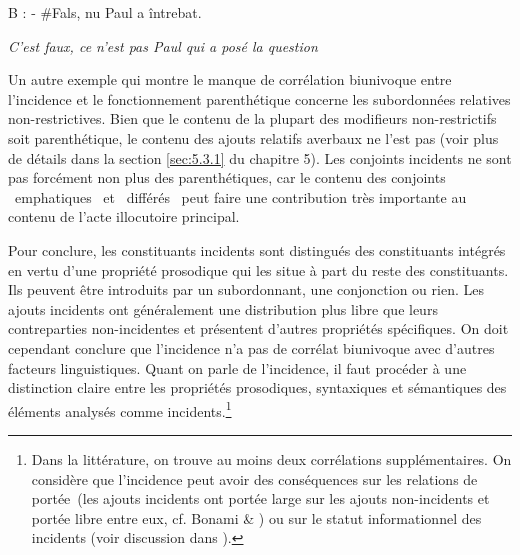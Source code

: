   B :  - \#Fals, nu Paul a întrebat.

    \textit{C'est faux, ce n'est pas Paul qui a posé la question}

Un autre exemple qui montre le manque de corrélation biunivoque entre l'incidence et le fonctionnement parenthétique concerne les subordonnées relatives non-restrictives. Bien que le contenu de la plupart des modifieurs non-restrictifs soit parenthétique, le contenu des ajouts relatifs averbaux ne l'est pas (voir plus de détails dans la section \ref{sec:5.3.1} du chapitre 5). Les conjoints incidents ne sont pas forcément non plus des parenthétiques, car le contenu des conjoints {\guillemotleft}~emphatiques~{\guillemotright} et {\guillemotleft}~différés~{\guillemotright} peut faire une contribution très importante au contenu de l'acte illocutoire principal.

Pour conclure, les constituants incidents sont distingués des constituants intégrés en vertu d'une propriété prosodique qui les situe à part du reste des constituants. Ils peuvent être introduits par un subordonnant, une conjonction ou rien. Les ajouts incidents ont généralement une distribution plus libre que leurs contreparties non-incidentes et présentent d'autres propriétés spécifiques. On doit cependant conclure que l'incidence n'a pas de corrélat biunivoque avec d'autres facteurs linguistiques. Quant on parle de l'incidence, il faut procéder à une distinction claire entre les propriétés prosodiques, syntaxiques et sémantiques des éléments analysés comme incidents.\footnote{Dans la littérature, on trouve au moins deux corrélations supplémentaires. On considère que l'incidence peut avoir des conséquences sur les relations de portée~(les ajouts incidents ont portée large sur les ajouts non-incidents et portée libre entre eux, cf. Bonami \& \citet{Godard2008a}) ou sur le statut informationnel des incidents (voir discussion dans \citet{Maekawa2007}). }  

